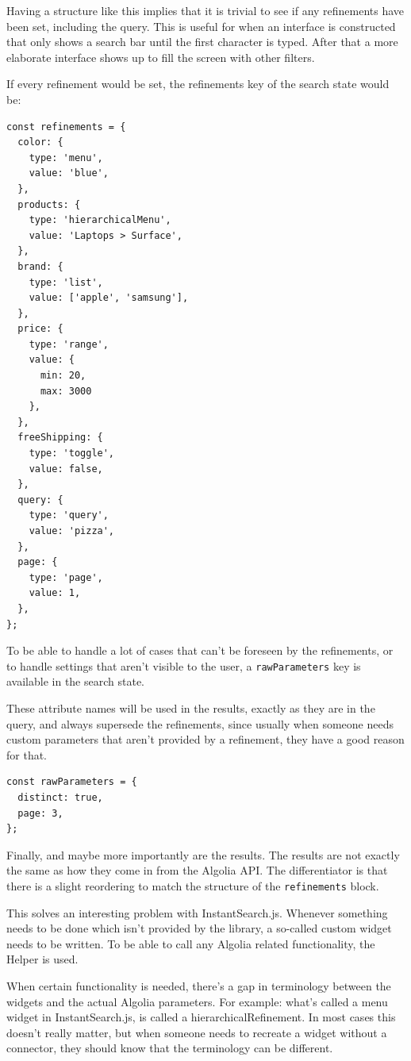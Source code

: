 Having a structure like this implies that it is trivial to see if any refinements have been set, including the query. This is useful for when an interface is constructed that only shows a search bar until the first character is typed. After that a more elaborate interface shows up to fill the screen with other filters.

If every refinement would be set, the refinements key of the search state would be:

\begin{lstlisting}[caption={Refinements in InstantSearch Core},label={lst:is-core-state-2}]
const refinements = {
  color: {
    type: 'menu',
    value: 'blue',
  },
  products: {
    type: 'hierarchicalMenu',
    value: 'Laptops > Surface',
  },
  brand: {
    type: 'list',
    value: ['apple', 'samsung'],
  },
  price: {
    type: 'range',
    value: {
      min: 20,
      max: 3000
    },
  },
  freeShipping: {
    type: 'toggle',
    value: false,
  },
  query: {
    type: 'query',
    value: 'pizza',
  },
  page: {
    type: 'page',
    value: 1,
  },
};
\end{lstlisting}

To be able to handle a lot of cases that can't be foreseen by the refinements, or to handle settings that aren't visible to the user, a {\tt rawParameters} key is available in the search state. 

These attribute names will be used in the results, exactly as they are in the query, and always supersede the refinements, since usually when someone needs custom parameters that aren't provided by a refinement, they have a good reason for that.

\begin{lstlisting}[caption={Passing raw Algolia parameters to InstantSearch Core},label={lst:is-core-state-3}]
const rawParameters = {
  distinct: true,
  page: 3,
};
\end{lstlisting}

Finally, and maybe more importantly are the results. The results are not exactly the same as how they come in from the Algolia API. The differentiator is that there is a slight reordering to match the structure of the {\tt refinements} block.

This solves an interesting problem with InstantSearch.js. Whenever something needs to be done which isn't provided by the library, a so-called custom widget needs to be written. To be able to call any Algolia related functionality, the Helper is used. 

When certain functionality is needed, there's a gap in terminology between the widgets and the actual Algolia parameters. For example: what's called a menu widget in InstantSearch.js, is called a hierarchicalRefinement. In most cases this doesn't really matter, but when someone needs to recreate a widget without a connector, they should know that the terminology can be different.

